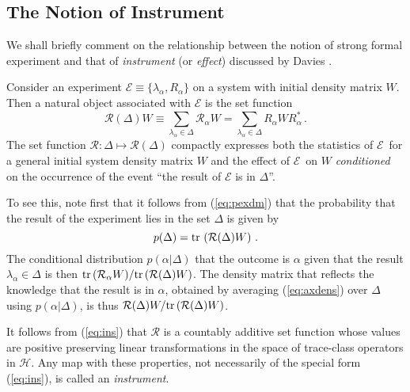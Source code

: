 \documentclass[12pt]{article}
\newcommand{\eq}[1]{(\ref{#1})}
\renewcommand{\dagger}{\ast}
\newcommand{\tr}{\mbox{${\rm tr}\,$}}
\renewcommand{\a}{\alpha}
\newcommand{\la}{\lambda_{\a}}
\renewcommand{\H}{\mbox{$\mathcal{H}$}}
\newcommand{\Aa}{R_{\a}}
\newcommand{\Aad}{R^{\dagger}_{\a}}
\newcommand{\Ex}{\mbox{$\mathcal{E}$}}
\begin{document}
\subsection{The Notion of Instrument}

We shall briefly comment on the relationship between the notion of
strong formal experiment and that of \emph{instrument} (or
\emph{effect}) discussed by Davies \cite{Dav76}.

Consider an experiment $\mathcal{E}\equiv\{\la, \Aa\}$ on a system
with initial density matrix $W$.  Then a natural object associated
with $\Ex$ is the set function
\begin{equation}
\mathcal{R}(\Delta) W \equiv\sum_{\lambda_\alpha \in
\Delta}\mathcal{R}_\a W =\sum_{\la\in \Delta}\Aa W\Aad \, .
\label{eq:ins}
\end{equation}
The set function $\mathcal{R}: \Delta \mapsto \mathcal{R} (\Delta)$
compactly expresses both the statistics of \Ex\ for a general initial
system density matrix $W$ and the effect of \Ex\ on $W$
\emph{conditioned} on the occurrence of the event ``the result of
\Ex{} is in $\Delta$''.

To see this, note first that it follows {}from \eq{eq:pexdm} that the
probability that the result of the experiment lies in the set $\Delta$
is given by
$$
p(\Delta)= \tr\left(\mathcal{R}(\Delta) W \right)\,. $$
The
conditional distribution $p(\a|\Delta)$ that the outcome is $\a$ given
that the result $\la\in\Delta$ is then $\tr(\mathcal{R}_\a W)/ \tr(
\mathcal{R}(\Delta) W )$. The density matrix that reflects the
knowledge that the result is in $\a$, obtained by averaging
\eq{eq:axdens} over $\Delta$ using $p(\a|\Delta)$, is thus
$\mathcal{R}(\Delta) W / \tr (\mathcal{R}(\Delta) W )$.



It follows {}from (\ref{eq:ins}) that $\mathcal{R}$ is a countably
additive set function whose values are positive preserving linear
transformations in the space of trace-class operators in \H. Any map
with these properties, not necessarily of the special form
(\ref{eq:ins}), is called an \emph{instrument}.
\end{document}
